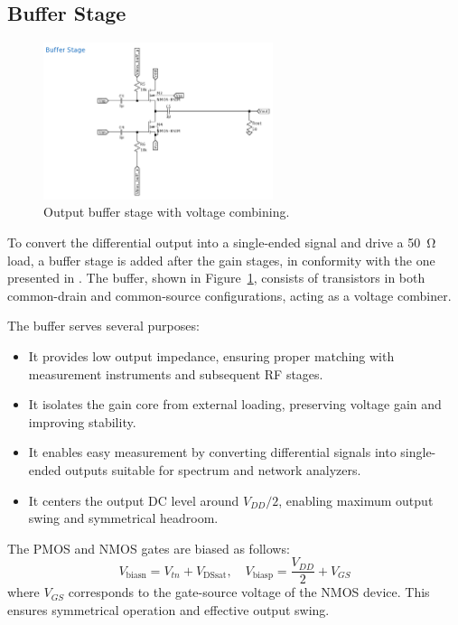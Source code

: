 \subsection{Buffer Stage}

\begin{figure}[H]
    \centering
    \includegraphics[width=0.6\textwidth]{Images/schem-Buffer.png}
    \caption{Output buffer stage with voltage combining.}
    \label{fig:schem-buffer}
\end{figure}

To convert the differential output into a single-ended signal and drive a 50~\si{\ohm} load, a buffer stage is added after the gain stages, in conformity with the one presented in \cite{Bastos2014}. The buffer, shown in Figure~\ref{fig:schem-buffer}, consists of transistors in both common-drain and common-source configurations, acting as a voltage combiner.

The buffer serves several purposes:
\begin{itemize}
    \item It provides low output impedance, ensuring proper matching with measurement instruments and subsequent RF stages.
    \item It isolates the gain core from external loading, preserving voltage gain and improving stability.
    \item It enables easy measurement by converting differential signals into single-ended outputs suitable for spectrum and network analyzers.
    \item It centers the output DC level around $V_{DD}/2$, enabling maximum output swing and symmetrical headroom.
\end{itemize}

The PMOS and NMOS gates are biased as follows:
\[
    V_{\text{biasn}} = V_{tn} + V_{\text{DSsat}}, \quad V_{\text{biasp}} = \frac{V_{DD}}{2} + V_{GS}
\]
where $V_{GS}$ corresponds to the gate-source voltage of the NMOS device. This ensures symmetrical operation and effective output swing.
